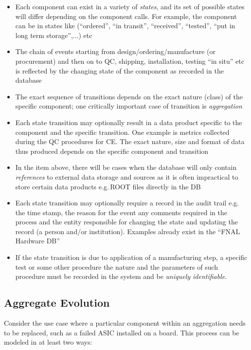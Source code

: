 \documentclass[pdftex,12pt,letter]{article}
\begin{document}
\begin{itemize}

\item Each component can exist in a variety of \textit{states}, and its set of possible states will differ depending on
the component calls. For example, the component can be in states like (``ordered'', ``in transit'', ``received'', ``tested'', ``put in long term storage'',...) etc

\item The chain of events starting from design/ordering/manufacture (or procurement) and then on to QC,
shipping, installation, testing ``in situ'' etc is reflected by the changing state of the component as recorded
in the database

\item The exact sequence of transitions depends on the exact nature (class) of the specific  component; one
critically important case of transition is \textit{aggregation}

\item Each state transition may optionally result in a data product specific to the component and the specific transition.
One example is metrics collected during the QC procedures for CE. The exact nature, size and format of data thus produced
depends on the specific component and transition

\item In the item above, there will be cases when the database will only contain \textit{references} to external data storage
and sources as it is often impractical to store certain data products e.g.\,ROOT files directly in the DB

\item Each state transition may optionally require a record in the audit trail e.g.\,the time stamp, the reason for the event
any comments required in the process and the entity responsible for changing the state and updating the record
(a person and/or institution). Examples already exist in the ``FNAL Hardware DB''

\item If the state transition is due to application of a manufacturing step, a specific test or some other procedure
the nature and the parameters of such procedure must be recorded in the system and be \textit{uniquely identifiable}.

\end{itemize}

\subsection{Aggregate Evolution}
\label{evolution}
Consider the use case where a particular component within an aggregation needs to be replaced,
such as a failed ASIC installed on a board. This process can be modeled in at least two ways:
\end{document}
